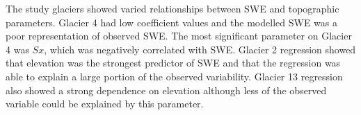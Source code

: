 \documentclass[12pt]{article}
\begin{document}
The study glaciers showed varied relationships between SWE and topographic parameters. Glacier 4 had low coefficient values and the modelled SWE was a poor representation of observed SWE. The most significant parameter on Glacier 4 was $Sx$, which was negatively correlated with SWE. Glacier 2 regression showed that elevation was the strongest predictor of SWE and that the regression was able to explain a large portion of the observed variability. Glacier 13 regression also showed a strong dependence on elevation although less of the observed variable could be explained by this parameter. 

 


	
	
	
\pagebreak


\end{document}
